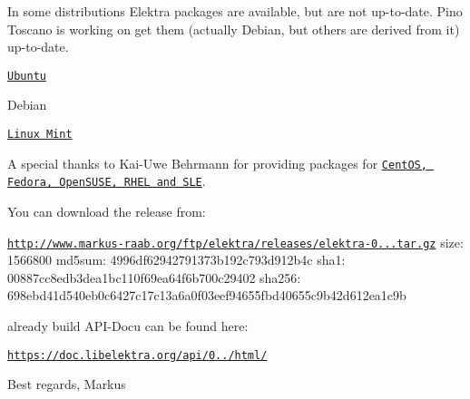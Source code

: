 In some distributions Elektra packages are available, but are not up-\/to-\/date. Pino Toscano is working on get them (actually Debian, but others are derived from it) up-\/to-\/date.


\begin{DoxyItemize}
\item \href{https://launchpad.net/ubuntu/+source/elektra}{\tt Ubuntu}
\item Debian
\item \href{http://community.linuxmint.com/software/view/elektra}{\tt Linux Mint}
\end{DoxyItemize}

A special thanks to Kai-\/\+Uwe Behrmann for providing packages for \href{http://software.opensuse.org/download.html?project=home%3Abekun&package=elektra}{\tt Cent\+OS, Fedora, Open\+S\+U\+SE, R\+H\+EL and S\+LE}.

You can download the release from\+:

\href{http://www.markus-raab.org/ftp/elektra/releases/elektra-0.8.7.tar.gz}{\tt http\+://www.\+markus-\/raab.\+org/ftp/elektra/releases/elektra-\/0...\+tar.\+gz} size\+: 1566800 md5sum\+: 4996df62942791373b192c793d912b4c sha1\+: 00887cc8edb3dea1bc110f69ea64f6b700c29402 sha256\+: 698ebd41d540eb0c6427c17c13a6a0f03eef94655fbd40655c9b42d612ea1c9b

already build A\+P\+I-\/\+Docu can be found here\+:

\href{https://doc.libelektra.org/api/0.8.7/html/}{\tt https\+://doc.\+libelektra.\+org/api/0../html/}

Best regards, Markus 